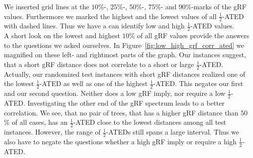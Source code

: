 We inserted grid lines at the $10$\%-, $25$\%-, $50$\%-, $75$\%- and $90$\%-marks of the gRF values. Furthermore we marked the highest and the lowest values of all $\frac{1}{2}$-ATED with dashed lines. Thus we have a can identify low and high $\frac{1}{2}$-ATED values.\\
A short look on the lowest and highest $10$\% of all gRF values provide the answers to the questions we asked ourselves. In Figure~\ref{fig:low_high_grf_corr_ated} we magnified on these left- and rightmost parts of the graph. Our instances suggest, that a short gRF distance does not correlate to a short or large $\frac{1}{2}$-ATED. Actually, our randomized test instances with short gRF distances realized one of the lowest $\frac{1}{2}$-ATED as well as one of the highest $\frac{1}{2}$-ATED. This negates our first and our second question. Neither does a low gRF imply, nor require a low $\frac{1}{2}$-ATED. Investigating the other end of the gRF spectrum leads to a better correlation. We see, that no pair of trees, that has a higher gRF distance than $50$\% of all cases, has an $\frac{1}{2}$-ATED close to the lowest distances among all test instances. However, the range of $\frac{1}{2}$-ATEDs still spans a large interval. Thus we also have to negate the questions whether a high gRF imply or require a high $\frac{1}{2}$-ATED. \\
